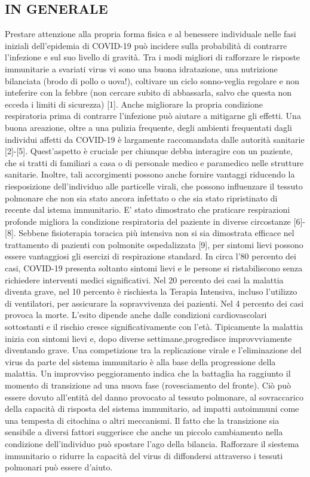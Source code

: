\documentclass[onecolumn,journal]{IEEEtran}
\begin{document}
\begin{multicols}{2}
\section*{IN GENERALE}
Prestare attenzione alla propria forma fisica e al benessere individuale nelle fasi iniziali dell'epidemia di COVID-19 può incidere sulla probabilità di contrarre l'infezione e sul suo livello di gravità. Tra i modi migliori di rafforzare le risposte immunitarie a svariati virus vi sono una buona idratazione, una nutrizione bilanciata (brodo di pollo o uova!), coltivare un ciclo sonno-veglia regolare e non inteferire con la febbre (non cercare subito di abbassarla, salvo che questa non ecceda i limiti di sicurezza) [1]. Anche migliorare la propria condizione respiratoria prima di contrarre l'infezione può aiutare a mitigarne gli effetti. Una buona areazione, oltre a una pulizia frequente, degli ambienti frequentati dagli individui affetti da COVID-19 è largamente raccomandata dalle autorità sanitarie [2]-[5]. Quest'aspetto è cruciale per chiunque debba interagire con un paziente, che si tratti di familiari a casa o di personale medico e paramedico nelle strutture sanitarie. Inoltre, tali accorgimenti possono anche fornire vantaggi riducendo la riesposizione dell'individuo alle particelle virali, che possono influenzare il tessuto polmonare che non sia stato ancora infettato o che sia stato ripristinato di recente dal istema immunitario. E' stato dimostrato che praticare respirazioni profonde migliora la condizione respiratoria del paziente in diverse circostanze [6]-[8]. Sebbene fisioterapia toracica più intensiva non si sia dimostrata efficace nel trattamento di pazienti con polmonite ospedalizzata [9], per sintomi lievi possono essere vantaggiosi gli esercizi di respirazione standard. In circa l'80 percento dei casi, COVID-19 presenta soltanto sintomi lievi e le persone si ristabiliscono senza richiedere interventi medici significativi. Nel 20 percento dei casi la malattia diventa grave, nel 10 percento è rischiesta la Terapia Intensiva, incluso l'utilizzo di ventilatori, per assicurare la sopravvivenza dei pazienti. Nel 4 percento dei casi provoca la morte. L'esito dipende anche dalle condizioni cardiovascolari sottostanti e il rischio cresce significativamente con l'età. Tipicamente la malattia inizia con sintomi lievi e, dopo diverse settimane,progredisce improvvviamente diventando grave. Una competizione tra la replicazione virale e l'eliminazione del virus da parte del sistema immunitario è alla base della progressione della malattia. Un improvviso peggioramento indica che la battaglia ha raggiunto il momento di transizione ad una nuova fase (rovesciamento del fronte). Ciò può essere dovuto all'entità del danno provocato al tessuto polmonare, al sovraccarico della capacità di risposta del sistema immunitario, ad impatti autoimmuni come una tempesta di citochina o altri meccanismi. Il fatto che la transizione sia sensibile a diversi fattori suggerisce che anche un piccolo cambiamento nella condizione dell'individuo può spostare l'ago della bilancia. Rafforzare il siestema immunitario o ridurre la capacità del virus di diffondersi attraverso i tessuti polmonari può essere d'aiuto.


\end{multicols}
\end{document}
